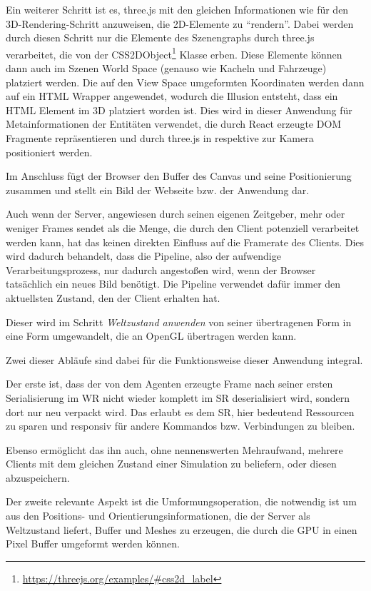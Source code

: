 \begin{itemize}
     Ein weiterer Schritt ist es, three.js mit den gleichen Informationen wie für den 3D-Rendering-Schritt anzuweisen, die 2D-Elemente zu \enquote{rendern}.
    Dabei werden durch diesen Schritt nur die Elemente des Szenengraphs durch three.js verarbeitet, die von der CSS2DObject\footnote{\url{https://threejs.org/examples/\#css2d_label}} Klasse erben.
    Diese Elemente können dann auch im Szenen World Space (genauso wie Kacheln und Fahrzeuge) platziert werden.
    Die auf den View Space umgeformten Koordinaten werden dann auf ein HTML Wrapper angewendet, wodurch die Illusion entsteht, dass ein HTML Element im 3D platziert worden ist.
    Dies wird in dieser Anwendung für Metainformationen der Entitäten verwendet, die durch React erzeugte DOM Fragmente repräsentieren und durch three.js in respektive zur Kamera positioniert werden.

     Im Anschluss fügt der Browser den Buffer des Canvas und seine Positionierung zusammen und stellt ein Bild der Webseite bzw.
    der Anwendung dar.
\end{itemize}

Auch wenn der Server, angewiesen durch seinen eigenen Zeitgeber, mehr oder weniger Frames sendet als die Menge, die durch den Client potenziell verarbeitet werden kann, hat das keinen direkten Einfluss auf die Framerate des Clients.
Dies wird dadurch behandelt, dass die Pipeline, also der aufwendige Verarbeitungsprozess, nur dadurch angestoßen wird, wenn der Browser tatsächlich ein neues Bild benötigt.
Die Pipeline verwendet dafür immer den aktuellsten Zustand, den der Client erhalten hat.

Dieser wird im Schritt \textit{Weltzustand anwenden} von seiner übertragenen Form in eine Form umgewandelt, die an OpenGL übertragen werden kann.

Zwei dieser Abläufe sind dabei für die Funktionsweise dieser Anwendung integral.

Der erste ist, dass der von dem Agenten erzeugte Frame nach seiner ersten Serialisierung im WR nicht wieder komplett im SR deserialisiert wird, sondern dort nur neu verpackt wird.
Das erlaubt es dem SR, hier bedeutend Ressourcen zu sparen und responsiv für andere Kommandos bzw. Verbindungen zu bleiben.

Ebenso ermöglicht das ihn auch, ohne nennenswerten Mehraufwand, mehrere Clients mit dem gleichen Zustand einer Simulation zu beliefern, oder diesen abzuspeichern.

Der zweite relevante Aspekt ist die Umformungsoperation, die notwendig ist um aus den Positions- und Orientierungsinformationen, die der Server als Weltzustand liefert, Buffer und Meshes zu erzeugen, die durch die GPU in einen Pixel Buffer umgeformt werden können.

